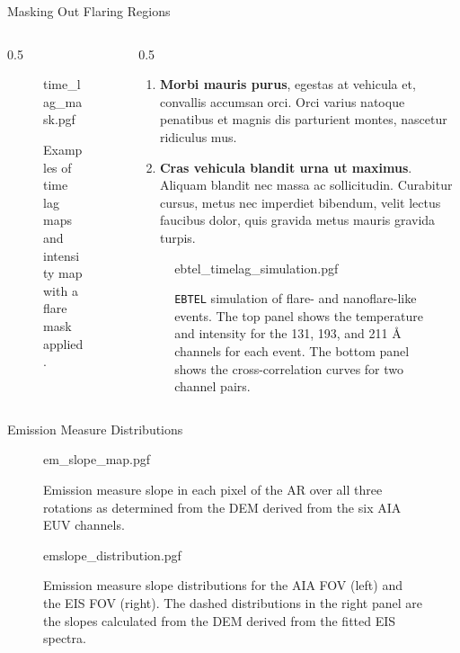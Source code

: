 \documentclass[final]{beamer}
\newlength{\colwidth}
\begin{document}
\begin{frame}[t]
\begin{columns}[t]
\begin{column}{\colwidth}
\begin{block}{Masking Out Flaring Regions}
    \begin{columns}[c]
      \begin{column}{0.5\colwidth}
        \begin{figure}
          \centering
          {time_lag_mask.pgf}
          \caption{Examples of time lag maps and intensity map with a flare mask applied.} 
          \label{fig:flare_masked_maps}
        \end{figure}
      \end{column}
      \begin{column}{0.5\colwidth}
        \begin{enumerate}
          \item \textbf{Morbi mauris purus}, egestas at vehicula et, convallis
            accumsan orci. Orci varius natoque penatibus et magnis dis parturient
            montes, nascetur ridiculus mus.
          \item \textbf{Cras vehicula blandit urna ut maximus}. Aliquam blandit nec
            massa ac sollicitudin. Curabitur cursus, metus nec imperdiet bibendum,
            velit lectus faucibus dolor, quis gravida metus mauris gravida turpis.
        \end{enumerate}
        \begin{figure}
          \centering
          {ebtel_timelag_simulation.pgf}
          \caption{\texttt{EBTEL} simulation of flare- and nanoflare-like events. The top panel shows the temperature and intensity for the 131, 193, and 211 Å channels for each event. The bottom panel shows the cross-correlation curves for two channel pairs.} 
          \label{fig:ebtel_timelag}
        \end{figure}
      \end{column}
    \end{columns}

  \end{block}

  \begin{block}{Emission Measure Distributions}

    \begin{figure}
      \centering
      {em_slope_map.pgf}
      \caption{Emission measure slope in each pixel of the AR over all three rotations as determined from the DEM derived from the six AIA EUV channels.} 
      \label{fig:em_slope_map}
    \end{figure}

    \begin{figure}
      \centering
      {emslope_distribution.pgf}
      \caption{Emission measure slope distributions for the AIA FOV (left) and the EIS FOV (right). The dashed distributions in the right panel are the slopes calculated from the DEM derived from the fitted EIS spectra.} 
      \label{fig:emslope_distribution}
    \end{figure}


\end{block}
\end{column}
\end{columns}
\end{frame}
\end{document}
